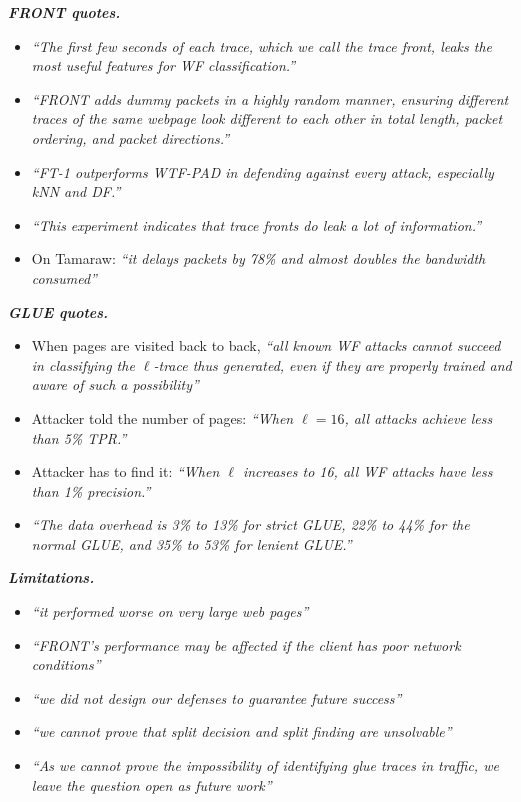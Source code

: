 \textbf{\textit{FRONT quotes.}}
\begin{itemize}
    \item \textit{``The first few seconds of each trace, which we call the trace front, leaks the most useful features for WF classification.''}~\cite[p.~721]{gong2020front}
    \item \textit{``FRONT adds dummy packets in a highly random manner, ensuring different traces of the same webpage look different to each other in total length, packet ordering, and packet directions.''}~\cite[p.~721]{gong2020front}
    \item \textit{``FT-1 outperforms WTF-PAD in defending against every attack, especially kNN and DF.''}~\cite[p.~723]{gong2020front}
    \item \textit{``This experiment indicates that trace fronts do leak a lot of information.''}~\cite[p.~724]{gong2020front}
    \item On Tamaraw: \textit{``it delays packets by 78\% and almost doubles the bandwidth consumed''}~\cite[p.~730]{gong2020front}
\end{itemize}

\textbf{\textit{GLUE quotes.}}
\begin{itemize}
    \item When pages are visited back to back, \textit{``all known WF attacks cannot succeed in classifying the $\ell$-trace thus generated, even if they are properly trained and aware of such a possibility''}~\cite[p.~725]{gong2020front}
    \item Attacker told the number of pages: \textit{``When $\ell = 16$, all attacks achieve less than 5\% TPR.''}~\cite[p.~728]{gong2020front}
    \item Attacker has to find it: \textit{``When $\ell$ increases to 16, all WF attacks have less than 1\% precision.''}~\cite[p.~728]{gong2020front}
    \item \textit{``The data overhead is 3\% to 13\% for strict GLUE, 22\% to 44\% for the normal GLUE, and 35\% to 53\% for lenient GLUE.''}~\cite[p.~729]{gong2020front}
\end{itemize}

\textbf{\textit{Limitations.}}
\begin{itemize}
    \item \textit{``it performed worse on very large web pages''}~\cite[p.~730]{gong2020front}
    \item \textit{``FRONT's performance may be affected if the client has poor network conditions''}~\cite[p.~730]{gong2020front}
    \item \textit{``we did not design our defenses to guarantee future success''}~\cite[p.~730]{gong2020front}
    \item \textit{``we cannot prove that split decision and split finding are unsolvable''}~\cite[p.~730]{gong2020front}
    \item \textit{``As we cannot prove the impossibility of identifying glue traces in traffic, we leave the question open as future work''}~\cite[p.~730]{gong2020front}
\end{itemize}

